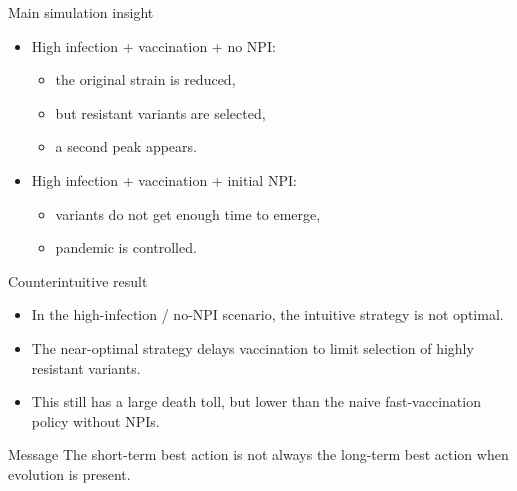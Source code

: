 \documentclass[
11pt,notheorems,hyperref={pdfauthor=whatever}
]{beamer}
\begin{document}
\begin{frame}{Main simulation insight}
	\begin{itemize}
		\item High infection + vaccination + no NPI:


		      \begin{itemize}
			      \item the original strain is reduced,

			            \medskip

			      \item but resistant variants are selected,

			            \medskip

			      \item a second peak appears.
		      \end{itemize}

		      \medskip

		\item High infection + vaccination + initial NPI:


		      \begin{itemize}
			      \item variants do not get enough time to emerge,

			            \medskip

			      \item pandemic is controlled.
		      \end{itemize}
	\end{itemize}
\end{frame}

\begin{frame}{Counterintuitive result}
	\begin{itemize}
		\item In the high-infection / no-NPI scenario, the intuitive strategy is \alert{not optimal}.
		\item The near-optimal strategy delays vaccination to limit selection of highly resistant variants.
		\item This still has a large death toll, but lower than the naive fast-vaccination policy without NPIs.
	\end{itemize}

	\begin{block}{Message}
		The short-term best action is not always the long-term best action when evolution is present.
	\end{block}
\end{frame}
\end{document}
